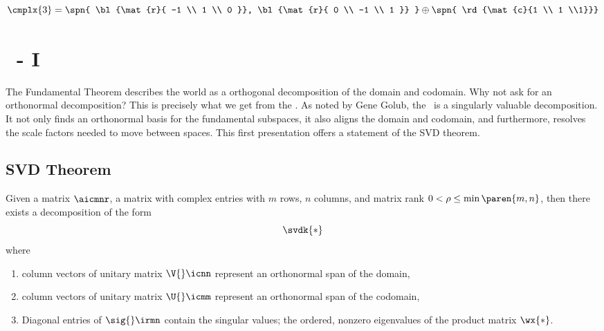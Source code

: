  \begin{equation*}   %
      \cmplx{3} = \spn { \bl{\mat{r}{ -1 \\ 1 \\ 0 }}, \bl{\mat{r}{ 0 \\ -1 \\ 1 }} } \oplus \spn { \rd{\mat{c}{1 \\ 1 \\1}}}
  \end{equation*}

\section{\bsvd\ - I}  %
The Fundamental Theorem describes the world as a orthogonal decomposition of the domain and codomain. Why not ask for an orthonormal decomposition? This is precisely what we get from the \asvd.
As noted by Gene Golub, the \asvd \ is a singularly valuable decomposition. It not only finds an orthonormal basis for the fundamental subspaces, it also aligns the domain and codomain, and furthermore, resolves the scale factors needed to move between spaces. This first presentation offers a statement of the SVD theorem.

\subsection{\label{ssec:SVD Theorem}SVD Theorem}  %
Given a matrix $\aicmnr$, a matrix with complex entries with $m$ rows, $n$ columns, and matrix rank $0<\rho\le\min\paren{m,n}$, then there exists a decomposition of the form
  \begin{equation}   %
    \svdk{*}
    \label{eq:svdk}
  \end{equation}
where
\begin{enumerate}
  \item column vectors of unitary matrix $\V{}\icnn$ represent an orthonormal span of the domain,
  \item column vectors of unitary matrix $\U{}\icmm$ represent an orthonormal span of the codomain,
  \item Diagonal entries of $\sig{}\irmn$ contain the singular values; the ordered, nonzero eigenvalues of the product matrix $\wx{*}$.
\end{enumerate}

